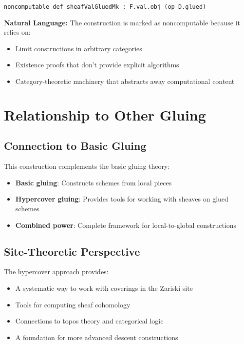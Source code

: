 \documentclass{article}
\theoremstyle{definition}
\begin{document}
\begin{lstlisting}
noncomputable def sheafValGluedMk : F.val.obj (op D.glued)
\end{lstlisting}

\textbf{Natural Language:} The construction is marked as noncomputable because it relies on:
\begin{itemize}
\item Limit constructions in arbitrary categories
\item Existence proofs that don't provide explicit algorithms
\item Category-theoretic machinery that abstracts away computational content
\end{itemize}

\section{Relationship to Other Gluing}

\subsection{Connection to Basic Gluing}

This construction complements the basic gluing theory:
\begin{itemize}
\item \textbf{Basic gluing}: Constructs schemes from local pieces
\item \textbf{Hypercover gluing}: Provides tools for working with sheaves on glued schemes
\item \textbf{Combined power}: Complete framework for local-to-global constructions
\end{itemize}

\subsection{Site-Theoretic Perspective}

The hypercover approach provides:
\begin{itemize}
\item A systematic way to work with coverings in the Zariski site
\item Tools for computing sheaf cohomology
\item Connections to topos theory and categorical logic
\item A foundation for more advanced descent constructions
\end{itemize}
\end{document}
